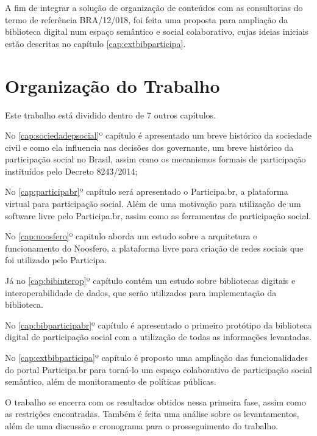 A fim de integrar a solução de organização de conteúdos com as consultorias do termo de referência BRA/12/018, foi feita uma proposta para ampliação da biblioteca digital num espaço semântico e social colaborativo, cujas ideias iniciais estão descritas no capítulo \ref{cap:extbibparticipa}.

\section{Organização do Trabalho}

Este trabalho está dividido dentro de 7 outros capítulos. 

No \ref{cap:sociedadepsocial}º capítulo é apresentado um breve histórico da sociedade civil e como ela influencia nas decisões dos governante, um breve histórico da participação social no Brasil, assim como os mecanismos formais de participação instituídos pelo Decreto 8243/2014;

No \ref{cap:participabr}º capítulo será apresentado o Participa.br, a plataforma virtual para participação social. Além de uma motivação para utilização de um software livre pelo Participa.br, assim como as ferramentas de participação social.

No \ref{cap:noosfero}º capitulo aborda um estudo sobre a arquitetura e funcionamento do Noosfero, a plataforma livre para criação de redes sociais que foi utilizado pelo Participa.

Já no \ref{cap:bibinterop}º capítulo contém um estudo sobre bibliotecas digitais e interoperabilidade de dados, que serão utilizados para implementação da biblioteca.

No \ref{cap:bibparticipabr}º capítulo é apresentado o primeiro protótipo da biblioteca digital de participação social com a utilização de todas as informações levantadas.

No \ref{cap:extbibparticipa}º capítulo é proposto uma ampliação das funcionalidades do portal Participa.br para torná-lo um espaço colaborativo de participação social semântico, além de monitoramento de políticas públicas.

O trabalho se encerra com os resultados obtidos nessa primeira fase, assim como as restrições encontradas. Também é feita uma análise sobre os levantamentos, além de uma discussão e cronograma para o prosseguimento do trabalho.
